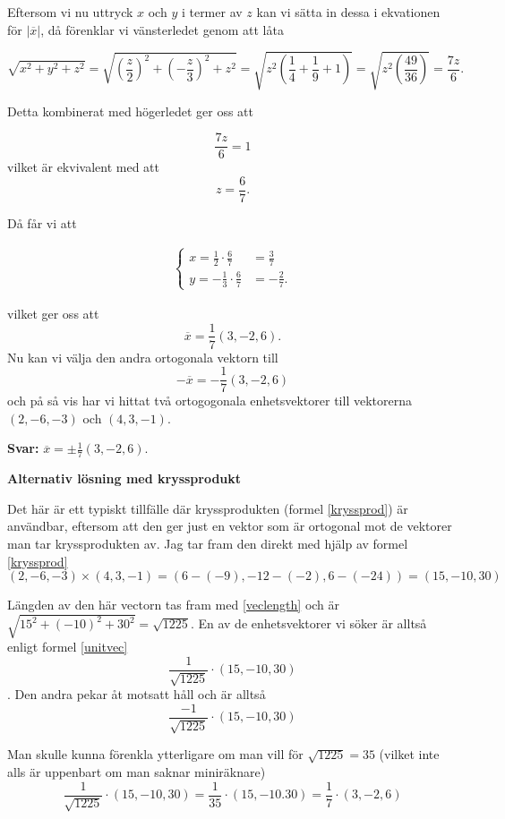 \documentclass[../../main.tex]{subfiles}
\begin{document}
\begin{solution}{5}
Eftersom vi nu uttryck $x$ och $y$ i termer av $z$ kan vi sätta in dessa i ekvationen för $|\overline{x}|$, då förenklar vi vänsterledet genom att låta 

$$\sqrt{x^2+y^2+z^2}=\sqrt{\left( \frac{z}{2} \right)^2+\left(-\frac{z}{3}\right)^2+z^2}=\sqrt{z^2\left( \frac{1}{4}+\frac{1}{9}+1\right)}=\sqrt{z^2\left(\frac{49}{36} \right)}=\frac{7z}{6}.$$

Detta kombinerat med högerledet ger oss att 

$$\frac{7z}{6}=1$$ vilket är ekvivalent med att
$$z=\frac{6}{7}.$$

Då får vi att 

\begin{align*}
    \begin{cases} 
     x=\frac{1}{2}\cdot\frac{6}{7}&=\frac{3}{7} \\
    y=-\frac{1}{3}\cdot\frac{6}{7}&=-\frac{2}{7}.
    \end{cases}
\end{align*}

vilket ger oss att $$\overline{x}=\frac{1}{7}(3,-2,6).$$ Nu kan vi välja den andra ortogonala vektorn till $$-\overline{x}=-\frac{1}{7}(3,-2,6)$$ och på så vis har vi hittat två ortogogonala enhetsvektorer till vektorerna $(2,-6,-3)$ och $(4,3,-1)$.

\bigskip

\textbf{Svar:} $\overline{x}=\pm \frac{1}{7}(3,-2,6)$.

\bigskip
\textbf{Alternativ lösning med kryssprodukt}

Det här är ett typiskt tillfälle där kryssprodukten (formel \ref{kryssprod}) är användbar, eftersom att den ger just en vektor som är ortogonal mot de vektorer man tar kryssprodukten av. Jag tar fram den direkt med hjälp av formel \ref{kryssprod}
\[(2, -6, -3)\times (4, 3, -1) = (6 - (-9), -12 - (-2), 6 - (-24)) = (15, -10, 30)\]

Längden av den här vectorn tas fram med \ref{veclength} och är \(\sqrt{15^2 + (-10)^2 + 30^2} = \sqrt{1225}\). En av de enhetsvektorer vi söker är alltså enligt formel \ref{unitvec} 
\[\frac{1}{\sqrt{1225}}\cdot(15, -10, 30)\].
Den andra pekar åt motsatt håll och är alltså 
\[\frac{-1}{\sqrt{1225}}\cdot(15, -10, 30)\]

Man skulle kunna förenkla ytterligare om man vill för $\sqrt{1225} = 35$ (vilket inte alls är uppenbart om man saknar miniräknare)
\[\frac{1}{\sqrt{1225}}\cdot(15, -10, 30) = \frac{1}{35}\cdot(15, -10. 30) = \frac{1}{7}\cdot(3, -2, 6)\]
\end{solution}
\end{document}
